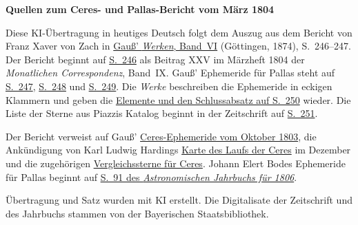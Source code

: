 \clearpage\thispagestyle{empty}
\begin{center}\textbf{Quellen zum Ceres- und Pallas-Bericht vom März 1804}\end{center}
\noindent Diese KI-Übertragung in heutiges Deutsch folgt dem Auszug aus dem Bericht von Franz Xaver von Zach in \href{https://gdz.sub.uni-goettingen.de/id/PPN236007467}{Gauß’ \textit{Werken}, Band~VI} (Göttingen, 1874), S.~246--247. Der Bericht beginnt auf \href{https://api.digitale-sammlungen.de/iiif/image/v2/bsb10538601_00260/full/1200,/0/default.jpg}{S.~246} als Beitrag XXV im Märzheft 1804 der \textit{Monatlichen Correspondenz}, Band~IX. Gauß’ Ephemeride für Pallas steht auf \href{https://api.digitale-sammlungen.de/iiif/image/v2/bsb10538601_00261/full/1450,/0/default.jpg}{S.~247}, \href{https://api.digitale-sammlungen.de/iiif/image/v2/bsb10538601_00262/full/1450,/0/default.jpg}{S.~248} und \href{https://api.digitale-sammlungen.de/iiif/image/v2/bsb10538601_00263/full/1450,/0/default.jpg}{S.~249}. Die \textit{Werke} beschreiben die Ephemeride in eckigen Klammern und geben die \href{https://api.digitale-sammlungen.de/iiif/image/v2/bsb10538601_00264/full/1450,/0/default.jpg}{Elemente und den Schlussabsatz auf S.~250} wieder. Die Liste der Sterne aus Piazzis Katalog beginnt in der Zeitschrift auf \href{https://api.digitale-sammlungen.de/iiif/image/v2/bsb10538601_00265/full/1250,/0/default.jpg}{S.~251}.
\par\smallskip\noindent Der Bericht verweist auf Gauß’ \href{https://api.digitale-sammlungen.de/iiif/image/v2/bsb10538600_00380/full/1450,/0/default.jpg}{Ceres-Ephemeride vom Oktober 1803}, die Ankündigung von Karl Ludwig Hardings \href{https://api.digitale-sammlungen.de/iiif/image/v2/bsb10538600_00547/full/1450,/0/default.jpg}{Karte des Laufs der Ceres} im Dezember und die zugehörigen \href{https://api.digitale-sammlungen.de/iiif/image/v2/bsb10538600_00548/full/1450,/0/default.jpg}{Vergleichssterne für Ceres}. Johann Elert Bodes Ephemeride für Pallas beginnt auf \href{https://api.digitale-sammlungen.de/iiif/image/v2/bsb10538335_00101/full/1450,/0/default.jpg}{S.~91 des \textit{Astronomischen Jahrbuchs für 1806}}.
\par\smallskip\noindent Übertragung und Satz wurden mit KI erstellt. Die Digitalisate der Zeitschrift und des Jahrbuchs stammen von der Bayerischen Staatsbibliothek.
\clearpage
